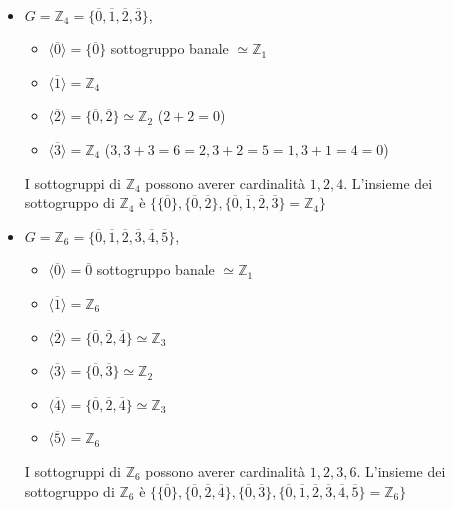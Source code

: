\documentclass[../main.tex]{subfiles}
\begin{document}
\begin{example}
    \
    \begin{itemize}
        \item $G = \mathbb{Z}_4 = \{\overline{0}, \overline{1}, \overline{2}, \overline{3}\}$, \
              \begin{itemize}
                  \item $\langle \overline{0} \rangle = \{\overline{0}\}$ sottogruppo banale $\simeq \mathbb{Z}_1$
                  \item $\langle \overline{1} \rangle = \mathbb{Z}_4$
                  \item $\langle \overline{2} \rangle = \{\overline{0}, \overline{2}\} \simeq \mathbb{Z}_2$ ($2+2=0$)
                  \item $\langle \overline{3} \rangle = \mathbb{Z}_4$ ($3 , 3+3=6=2, 3+2=5=1, 3+1=4=0$)
              \end{itemize}
              I sottogruppi di $\mathbb{Z}_4$ possono averer cardinalità $1,2,4$. L'insieme
              dei sottogruppo di $\mathbb{Z}_4$ è $\{\{\overline{0}\}, \{\overline{0}, \overline{2}\},
                  \{\overline{0}, \overline{1}, \overline{2}, \overline{3}\}= \mathbb{Z}_4\}$
        \item $G = \mathbb{Z}_6 = \{\overline{0}, \overline{1}, \overline{2}, \overline{3}, \overline{4}, \overline{5}\}$, \
              \begin{itemize}
                  \item $\langle \overline{0} \rangle = {\overline{0}}$ sottogruppo banale $\simeq \mathbb{Z}_1$
                  \item $\langle \overline{1} \rangle = \mathbb{Z}_6$
                  \item $\langle \overline{2} \rangle = \{\overline{0}, \overline{2}, \overline{4}\} \simeq \mathbb{Z}_3$
                  \item $\langle \overline{3} \rangle = \{\overline{0}, \overline{3}\} \simeq \mathbb{Z}_2$
                  \item $\langle \overline{4} \rangle = \{\overline{0}, \overline{2}, \overline{4}\} \simeq \mathbb{Z}_3$
                  \item $\langle \overline{5} \rangle = \mathbb{Z}_6$
              \end{itemize}
              I sottogruppi di $\mathbb{Z}_6$ possono averer cardinalità $1,2,3,6$. L'insieme dei sottogruppo di $\mathbb{Z}_6$ è $\{\{\overline{0}\}, \{\overline{0}, \overline{2}, \overline{4}\}, \{\overline{0}, \overline{3}\}, \{\overline{0}, \overline{1}, \overline{2}, \overline{3}, \overline{4}, \overline{5}\}= \mathbb{Z}_6\}$
    \end{itemize}
\end{example}
\end{document}
